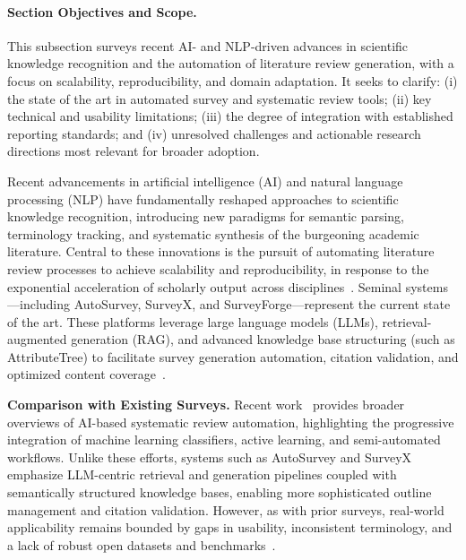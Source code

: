 \documentclass[sigconf]{acmart}
\begin{document}
\paragraph{Section Objectives and Scope.} This subsection surveys recent AI- and NLP-driven advances in scientific knowledge recognition and the automation of literature review generation, with a focus on scalability, reproducibility, and domain adaptation. It seeks to clarify: (i) the state of the art in automated survey and systematic review tools; (ii) key technical and usability limitations; (iii) the degree of integration with established reporting standards; and (iv) unresolved challenges and actionable research directions most relevant for broader adoption.

Recent advancements in artificial intelligence (AI) and natural language processing (NLP) have fundamentally reshaped approaches to scientific knowledge recognition, introducing new paradigms for semantic parsing, terminology tracking, and systematic synthesis of the burgeoning academic literature. Central to these innovations is the pursuit of automating literature review processes to achieve scalability and reproducibility, in response to the exponential acceleration of scholarly output across disciplines~\cite{ref111}. Seminal systems—including AutoSurvey, SurveyX, and SurveyForge—represent the current state of the art. These platforms leverage large language models (LLMs), retrieval-augmented generation (RAG), and advanced knowledge base structuring (such as AttributeTree) to facilitate survey generation automation, citation validation, and optimized content coverage~\cite{ref10,ref11,ref12,ref28,ref29,ref30,ref31,ref35,ref36,ref37,ref38,ref39,ref46,ref47,ref49,ref51,ref62,ref80,ref86,ref88,ref89,ref90,ref91,ref94,ref96,ref97,ref98,ref102,ref108}.

\textbf{Comparison with Existing Surveys.} Recent work~\cite{ref38,ref37,ref80,ref31} provides broader overviews of AI-based systematic review automation, highlighting the progressive integration of machine learning classifiers, active learning, and semi-automated workflows. Unlike these efforts, systems such as AutoSurvey and SurveyX emphasize LLM-centric retrieval and generation pipelines coupled with semantically structured knowledge bases, enabling more sophisticated outline management and citation validation. However, as with prior surveys, real-world applicability remains bounded by gaps in usability, inconsistent terminology, and a lack of robust open datasets and benchmarks~\cite{ref80,ref31}.
\end{document}
